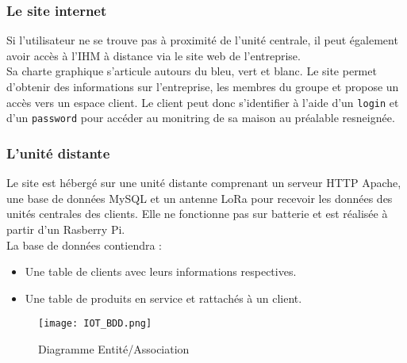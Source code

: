 \documentclass[11pt]{scrartcl} %
\begin{document}
\subsubsection{Le site internet}

Si l'utilisateur ne se trouve pas à proximité de l'unité centrale, il peut également avoir accès à l'IHM à distance via le site web de l'entreprise.\\
Sa charte graphique s'articule autours du bleu, vert et blanc. Le site permet d'obtenir des informations sur l'entreprise, les membres du groupe et propose un accès vers un espace client. Le client peut donc s'identifier à l'aide d'un \texttt{login} et d'un \texttt{password} pour accéder au monitring de sa maison au préalable resneignée.

\subsubsection{L'unité distante}

Le site est hébergé sur une unité distante comprenant un serveur HTTP Apache, une base de données MySQL et un antenne LoRa pour recevoir les données des unités centrales des clients. Elle ne fonctionne pas sur batterie et est réalisée à partir d'un Rasberry Pi.\\
La base de données contiendra :
\begin{itemize}
	\item{Une table de clients avec leurs informations respectives.}
	\item{Une table de produits en service et rattachés à un client.}
\end{itemize}

\begin{figure}[h] %
	\centering
	\texttt{[image: IOT\_BDD.png]} %
	\caption{Diagramme Entité/Association}
\end{figure}
\end{document}
